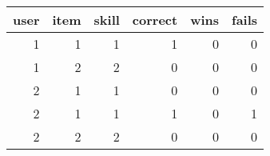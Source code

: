\begin{tabular}{rrrrrr}
\toprule
 user &  item &  skill &  correct &  wins &  fails \\
\midrule
    1 &     1 &      1 &        1 &     0 &      0 \\
    1 &     2 &      2 &        0 &     0 &      0 \\
    2 &     1 &      1 &        0 &     0 &      0 \\
    2 &     1 &      1 &        1 &     0 &      1 \\
    2 &     2 &      2 &        0 &     0 &      0 \\
\bottomrule
\end{tabular}
